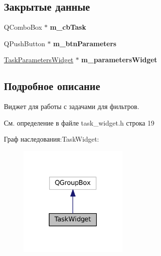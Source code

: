 \subsection*{Закрытые данные}
\begin{DoxyCompactItemize}
\item 
\hypertarget{class_task_widget_afbdad5a3494264c0edcd3fc2444bb5bb}{}\label{class_task_widget_afbdad5a3494264c0edcd3fc2444bb5bb} 
Q\+Combo\+Box $\ast$ {\bfseries m\+\_\+cb\+Task}
\item 
\hypertarget{class_task_widget_a150a4b841480dcce86914f04635812ef}{}\label{class_task_widget_a150a4b841480dcce86914f04635812ef} 
Q\+Push\+Button $\ast$ {\bfseries m\+\_\+btn\+Parameters}
\item 
\hypertarget{class_task_widget_a5feaeeed716a49df8022b6b712c69840}{}\label{class_task_widget_a5feaeeed716a49df8022b6b712c69840} 
\hyperlink{class_task_parameters_widget}{Task\+Parameters\+Widget} $\ast$ {\bfseries m\+\_\+parameters\+Widget}
\end{DoxyCompactItemize}


\subsection{Подробное описание}
Виджет для работы с задачами для фильтров. 

См. определение в файле task\+\_\+widget.\+h строка 19



Граф наследования\+:Task\+Widget\+:
\nopagebreak
\begin{figure}[H]
\begin{center}
\leavevmode
\includegraphics[width=153pt]{class_task_widget__inherit__graph}
\end{center}
\end{figure}



